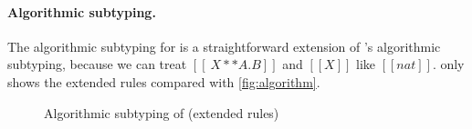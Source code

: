 \paragraph{Algorithmic subtyping.}

The algorithmic subtyping for \fnamee is a straightforward extension of \namee's
algorithmic subtyping, because we can treat $[[ \ X ** A . B ]]$ and $[[X]]$
like $[[nat]]$.  only shows the extended rules compared
with \cref{fig:algorithm}.

\begin{figure}
  \centering
  \caption{Algorithmic subtyping of \fnamee (extended rules)}
  \label{fig:algo:sub:fi}
\end{figure}

